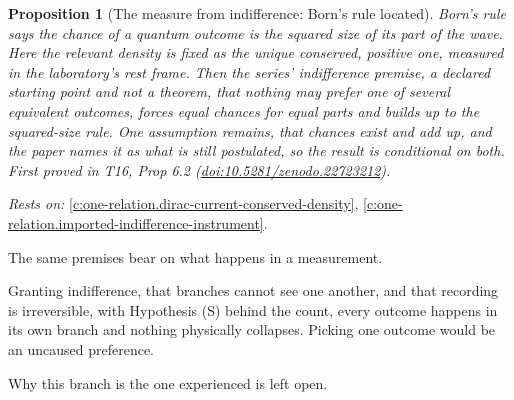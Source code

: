 \documentclass[11pt]{article}
\newtheorem{proposition}[theorem]{Proposition}
\theoremstyle{definition}
\theoremstyle{plain}
\begin{document}
\begin{proposition}[The measure from indifference: Born's rule located]\label{c:one-relation.measure-indifference-borns-rule-located}
Born's rule says the chance of a quantum outcome is the squared size of its part of the wave. Here the relevant density is fixed as the unique conserved, positive one, measured in the laboratory's rest frame. Then the series' indifference premise, a declared starting point and not a theorem, that nothing may prefer one of several equivalent outcomes, forces equal chances for equal parts and builds up to the squared-size rule. One assumption remains, that chances exist and add up, and the paper names it as what is still postulated, so the result is conditional on both.
\emph{First proved in} T16, Prop 6.2 (\href{https://doi.org/10.5281/zenodo.22723212}{doi:10.5281/zenodo.22723212}).
\end{proposition}
\noindent\emph{Rests on:} \ref{c:one-relation.dirac-current-conserved-density}, \ref{c:one-relation.imported-indifference-instrument}.

The same premises bear on what happens in a measurement.

Granting indifference, that branches cannot see one another, and that recording is irreversible, with Hypothesis (S) behind the count, every outcome happens in its own branch and nothing physically collapses. Picking one outcome would be an uncaused preference.

Why this branch is the one experienced is left open.
\end{document}
